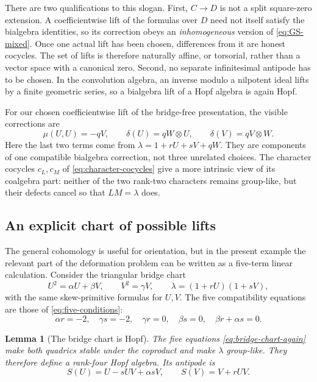 \documentclass[11pt]{amsart}
\newtheorem{lemma}[theorem]{Lemma}
\theoremstyle{definition}
\theoremstyle{remark}
\newcommand{\ot}{\otimes}
\begin{document}
There are two qualifications to this slogan.  First, \(C\to D\) is not a
split square-zero extension.  A coefficientwise lift of the formulas over
\(D\) need not itself satisfy the bialgebra identities, so its correction
obeys an \emph{inhomogeneous} version of
\eqref{eq:GS-mixed}.  Once one actual lift has been chosen, differences
from it are honest cocycles.  The set of lifts is therefore naturally
affine, or torsorial, rather than a vector space with a canonical zero.
Second, no separate infinitesimal antipode has to be chosen.  In the
convolution algebra, an inverse modulo a nilpotent ideal lifts by a finite
geometric series, so a bialgebra lift of a Hopf algebra is again Hopf.

For our chosen coefficientwise lift of the bridge-free presentation, the
visible corrections are
\begin{equation}\label{eq:visible-GS-corrections}
 \mu(U,U)=-qV,
 \qquad
 \delta(U)=qW\ot U,
 \qquad
 \delta(V)=qV\ot W.
\end{equation}
Here the last two terms come from
\(\lambda=1+rU+sV+qW\).  They are components of one compatible
bialgebra correction, not three unrelated choices.  The character
cocycles \(c_L,c_M\) of \eqref{eq:character-cocycles} give a more
intrinsic view of its coalgebra part: neither of the two rank-two
characters remains group-like, but their defects cancel so that
\(LM=\lambda\) does.

\subsection{An explicit chart of possible lifts}
\label{subsec:explicit-lifts}

The general cohomology is useful for orientation, but in the present
example the relevant part of the deformation problem can be written as a
five-term linear calculation.  Consider the triangular bridge chart
\[
 U^2=\alpha U+\beta V,\qquad V^2=\gamma V,\qquad
 \lambda=(1+rU)(1+sV),
\]
with the same skew-primitive formulas for \(U,V\).  The five compatibility
equations are those of \eqref{eq:five-conditions}:
\begin{equation}\label{eq:bridge-chart-again}
 \alpha r=-2,\quad \gamma s=-2,\quad
 \gamma r=0,\quad \beta s=0,\quad
 \beta r+\alpha s=0.
\end{equation}

\begin{lemma}[The bridge chart is Hopf]\label{lem:bridge-chart-Hopf}
The five equations \eqref{eq:bridge-chart-again} make both quadrics stable
under the coproduct and make \(\lambda\) group-like.  They therefore
define a rank-four Hopf algebra.  Its antipode is
\begin{equation}\label{eq:general-bridge-antipode}
 S(U)=U-sUV+\alpha sV,\qquad S(V)=V+rUV.
\end{equation}
\end{lemma}
\end{document}
